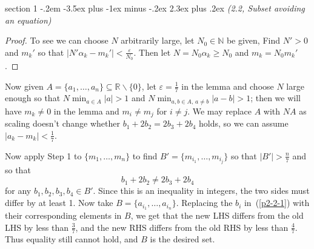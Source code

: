 \documentclass[12pt]{article}
\makeatletter
\theoremstyle{norm}
\newcommand{\N}[0]{\mathbb{N}}
\newcommand{\R}[0]{\mathbb{R}}
\newcommand{\rc}[1]{\frac{1}{#1}}
\newcommand{\subeq}[0]{\subseteq}
\newcommand{\al}[0]{\alpha}
\newcommand{\ep}[0]{\varepsilon}
\newcommand{\bs}[0]{\backslash}
\newenvironment{problem}{\@startsection
       {section}
       {1}
       {-.2em}
       {-3.5ex plus -1ex minus -.2ex}
       {2.3ex plus .2ex}
       {\pagebreak[3]%
       \large\bf\noindent{Problem }
       }
       }
       {%
       }
\makeatother
\begin{document}
\begin{problem}{\it (2.2, Subset avoiding an equation)}
\begin{proof}
To see we can choose $N$ arbitrarily large, let $N_0\in \N$ be given, Find $N'>0$ and $m_k'$ so that $|N'\al_k-m_k'|<\frac{\ep}{N_0}$. Then let $N=N_0\al_k\geq N_0$ and $m_k=N_0m_k'$.
\end{proof}
Now given $A=\{a_1,\ldots, a_n\}\subeq \R\bs \{0\}$, let $\ep=\rc{7}$ in the lemma and choose $N$ large enough so that $N\min_{a\in A}|a|>1$ and $N\min_{a,b\in A,\,a\neq b}|a-b|>1$; then we will have $m_k\neq 0$ in the lemma and $m_i\neq m_j$ for $i\neq j$. 
We may replace $A$ with $NA$ as scaling doesn't change whether $b_1+2b_2= 2b_3+2b_4$ holds, so we can assume $|a_k-m_k|<\rc{7}$.

Now apply Step 1 to $\{m_1,\ldots, m_n\}$ to find $B'=\{m_{i_1},\ldots, m_{i_j}\}$ so that $|B'|>\frac{n}{7}$ and so that
\begin{equation}\label{p2-2-1}
b_1+2b_2\neq 2b_3+2b_4
\end{equation}
for any $b_1,b_2,b_3,b_4\in B'$. Since this is an inequality in integers, the two sides must differ by at least 1.
Now take $B=\{a_{i_1},\ldots, a_{i_n}\}$. Replacing the $b_i$ in~(\ref{p2-2-1}) with their corresponding elements in $B$, we get that the new LHS differs from the old LHS by less than $\frac{3}{7}$, and the new RHS differs from the old RHS by less than $\frac{4}{7}$. Thus equality still cannot hold, and $B$ is the desired set.
\end{problem}
\end{document}
